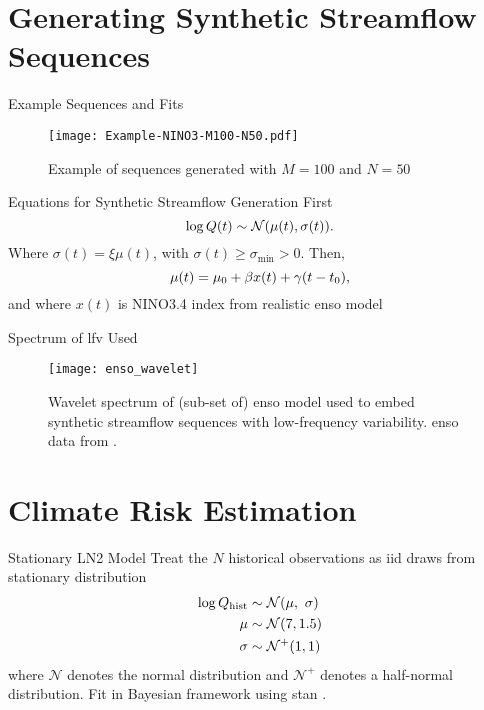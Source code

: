 \documentclass[
  10pt,     %
]{beamer}
\newcommand{\normal}{\mathcal{N}}
\begin{document}
\section{Generating Synthetic Streamflow Sequences}

\begin{frame}{Example Sequences and Fits}
  \begin{figure}
    \texttt{[image: Example-NINO3-M100-N50.pdf]}
    \caption{Example of sequences generated with $M=100$ and $N=50$}
  \end{figure}
\end{frame}

\begin{frame}{Equations for Synthetic Streamflow Generation}
  First
  \begin{equation} \label{eq:lognormal}
    \log Q(t) \sim \normal \qty(\mu(t), \sigma(t)).
  \end{equation}
  Where $\sigma(t) = \xi \mu(t)$, with $\sigma(t) \geq \sigma_\text{min} > 0$.
  Then,
  \begin{equation}\label{eq:nino3}
    \mu(t) = \mu_0 + \beta x(t) + \gamma \qty(t - t_0),
  \end{equation}
  and where $x(t)$ is NINO3.4 index from realistic \gls{enso} model \citep{Zebiak:1987cl,Ramesh:2016hf}
\end{frame}

\begin{frame}{Spectrum of \gls{lfv} Used}
  \begin{figure}
    \texttt{[image: enso\_wavelet]}
    \caption{
      Wavelet spectrum of (sub-set of) \gls{enso} model used to embed synthetic streamflow sequences with low-frequency variability.
      \gls{enso} data from \citet{Ramesh:2016hf}.
    }
  \end{figure}
\end{frame}

\section{Climate Risk Estimation}

\begin{frame}{Stationary LN2 Model}
  Treat the $N$ historical observations as \gls{iid} draws from stationary distribution
  \begin{align}\label{eq:ln2-stationary}
    \begin{split}
      \log Q_\text{hist} & \sim \normal \qty(\mu, \ \sigma) \\
      \mu &\sim \normal \qty(7, 1.5) \\
      \sigma &\sim \normal^+ \qty(1, 1)
    \end{split}
  \end{align}
  where $\normal$ denotes the normal distribution and $\normal^+$ denotes a half-normal distribution.
  Fit in Bayesian framework using stan \citep{Carpenter:2017ke}.
\end{frame}
\end{document}
